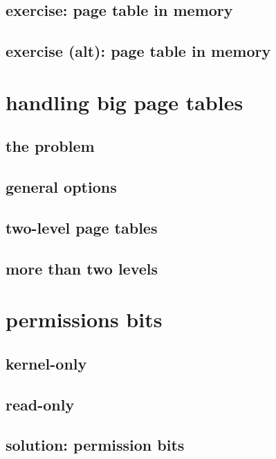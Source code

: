\subsection{exercise: page table in memory}

\subsection{exercise (alt): page table in memory}


\section{handling big page tables}
\subsection{the problem}


\subsection{general options}


\subsection{two-level page tables}



\subsection{more than two levels}


\section{permissions bits}
\subsection{kernel-only}


\subsection{read-only}

\subsection{solution: permission bits}



